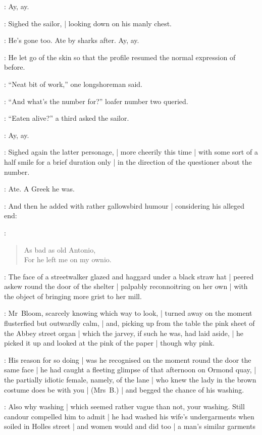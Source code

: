 \Murphy:
Ay, ay.

:
Sighed the sailor, |
looking down on his manly chest.

\Murphy:
He's gone too.
Ate by sharks after.
Ay, ay.

:
He let go of the skin so
that the profile resumed the normal expression of before.

:
``Neat bit of work,''
one longshoreman said.

:
``And what's the number for?''
loafer number two queried.

:
``Eaten alive?''
a third asked the sailor.

\Murphy:
Ay, ay.

:
Sighed again the latter personage, |
more cheerily this time |
with some sort of a half smile for a brief duration only |
in the direction of the questioner about the number.

\Murphy:
Ate.
A Greek he was.

:
And then he added with rather gallowsbird humour |
considering his alleged end:

\Murphy:
\begin{verse}
    As bad as old Antonio,\\
    For he left me on my ownio.
\end{verse}

:
The face of a streetwalker glazed and haggard under a black straw hat |
peered askew round the door of the shelter |
palpably reconnoitring on her own |
with the object of bringing more grist to her mill.

:
Mr~Bloom, scarcely knowing which way to look, |
turned away on the moment flusterfied but outwardly calm, |
and, picking up from the table the pink sheet of the Abbey street organ |
which the jarvey, if such he was, had laid aside, |
he picked it up and looked at the pink of the paper |
though why pink.

:
His reason for so doing |
was he recognised on the moment round the door the same face |
he had caught a fleeting glimpse of that afternoon on Ormond quay, |
the partially idiotic female, namely, of the lane |
who knew the lady in the brown costume does be with you |
(Mrs~B.) |
and begged the chance of his washing.

:
Also why washing |
which seemed rather vague than not, your washing.
Still candour compelled him to admit |
he had washed his wife's undergarments when soiled in Holles street |
and women would and did too |
a man's similar garments

